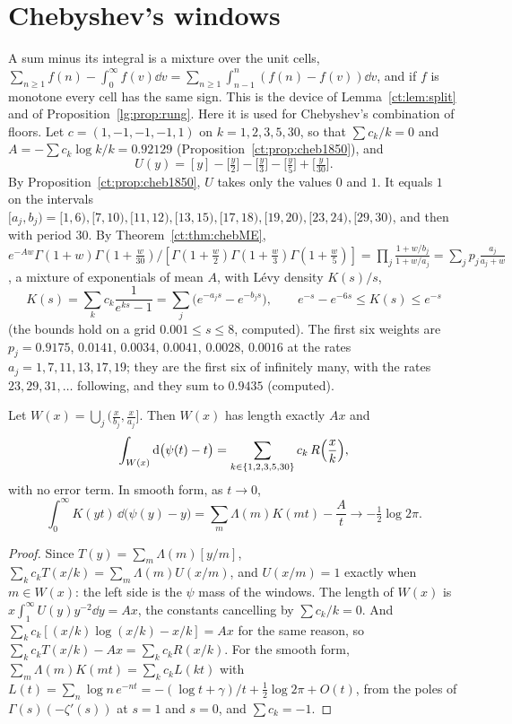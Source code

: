 \section{Chebyshev's windows}\label{lg:sec:windows}
A sum minus its integral is a mixture over the unit cells, $\sum_{n\ge1}f(n)-\int_0^\infty f(v)\dd v=\sum_{n\ge1}\int_{n-1}^n(f(n)-f(v))\dd v$, and if $f$ is monotone every cell has the same sign. This is the device of Lemma~\ref{ct:lem:split} and of Proposition~\ref{lg:prop:rung}. Here it is used for Chebyshev's combination of floors. Let $c=(1,-1,-1,-1,1)$ on $k=1,2,3,5,30$, so that $\sum c_k/k=0$ and $A=-\sum c_k\log k/k=0.92129$ (Proposition~\ref{ct:prop:cheb1850}), and
\[
U(y)=[y]-\bigl[\tfrac y2\bigr]-\bigl[\tfrac y3\bigr]-\bigl[\tfrac y5\bigr]+\bigl[\tfrac y{30}\bigr].
\]
By Proposition~\ref{ct:prop:cheb1850}, $U$ takes only the values $0$ and $1$. It equals $1$ on the intervals $[a_j,b_j)=[1,6),[7,10),[11,12),[13,15),[17,18),[19,20),[23,24),[29,30)$, and then with period $30$. By Theorem~\ref{ct:thm:chebME}, $e^{-Aw}\Gamma(1+w)\Gamma(1+\frac w{30})/[\Gamma(1+\frac w2)\Gamma(1+\frac w3)\Gamma(1+\frac w5)]=\prod_j\frac{1+w/b_j}{1+w/a_j}=\sum_jp_j\frac{a_j}{a_j+w}$, a mixture of exponentials of mean $A$, with Lévy density $K(s)/s$,
\[
K(s)=\sum_kc_k\frac1{e^{ks}-1}=\sum_j\bigl(e^{-a_js}-e^{-b_js}\bigr),\qquad e^{-s}-e^{-6s}\le K(s)\le e^{-s}
\]
(the bounds hold on a grid $0.001\le s\le8$, computed). The first six weights are $p_j=0.9175$, $0.0141$, $0.0034$, $0.0041$, $0.0028$, $0.0016$ at the rates $a_j=1,7,11,13,17,19$; they are the first six of infinitely many, with the rates $23,29,31,\dots$ following, and they sum to $0.9435$ (computed).
\begin{theorem}\label{lg:thm:window}
Let $W(x)=\bigcup_j(\frac x{b_j},\frac x{a_j}]$. Then $W(x)$ has length exactly $Ax$ and
\[
\int_{W(x)}\mathrm{d}\bigl(\psi(t)-t\bigr)=\sum_{k\in\{1,2,3,5,30\}}c_k\,R\Bigl(\frac xk\Bigr),
\]
with no error term. In smooth form, as $t\to0$,
\[
\int_0^\infty K(yt)\,\dd\bigl(\psi(y)-y\bigr)=\sum_m\Lambda(m)K(mt)-\frac At\longrightarrow-\tfrac12\log2\pi .
\]
\end{theorem}
\begin{proof}
Since $T(y)=\sum_m\Lambda(m)[y/m]$, $\sum_kc_kT(x/k)=\sum_m\Lambda(m)U(x/m)$, and $U(x/m)=1$ exactly when $m\in W(x)$: the left side is the $\psi$ mass of the windows. The length of $W(x)$ is $x\int_1^\infty U(y)y^{-2}\dd y=Ax$, the constants cancelling by $\sum c_k/k=0$. And $\sum_kc_k[(x/k)\log(x/k)-x/k]=Ax$ for the same reason, so $\sum_kc_kT(x/k)-Ax=\sum_kc_kR(x/k)$. For the smooth form, $\sum_m\Lambda(m)K(mt)=\sum_kc_kL(kt)$ with $L(t)=\sum_n\log n\,e^{-nt}=-(\log t+\gamma)/t+\frac12\log2\pi+O(t)$, from the poles of $\Gamma(s)(-\zeta'(s))$ at $s=1$ and $s=0$, and $\sum c_k=-1$.
\end{proof}

